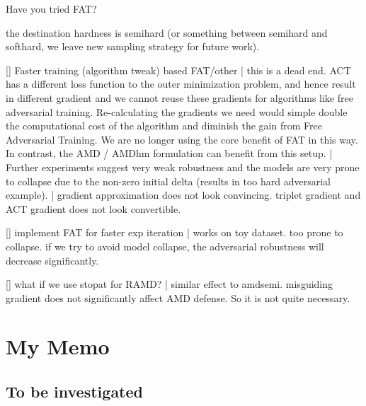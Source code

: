 	 Have you tried FAT?

	 the destination hardness is semihard (or something between semihard
		and softhard, we leave new sampling strategy for future work).

	 [\xmark] Faster training (algorithm tweak) based FAT/other | this is
		a dead end. ACT has a different loss function to the outer minimization
		problem, and hence result in different gradient and we cannot reuse
		these gradients for algorithms like free adversarial training.
		Re-calculating the gradients we need would simple double the
		computational cost of the algorithm and diminish the gain from Free
		Adversarial Training. We are no longer using the core benefit of FAT in
		this way. In contrast, the AMD / AMDhm formulation can benefit from
		this setup. | Further experiments suggest very weak robustness and the
		models are very prone to collapse due to the non-zero initial delta
		(results in too hard adversarial example).  | gradient approximation
		does not look convincing. triplet gradient and ACT gradient does not
		look convertible.

	 [\cmark] implement FAT for faster exp iteration | works on toy
		dataset. too prone to collapse. if we try to avoid model collapse, the
		adversarial robustness will decrease significantly.

	 [\cmark] what if we use stopat for RAMD? | similar effect to amdsemi.
		misguiding gradient does not significantly affect AMD defense. So it
		is not quite necessary.
	




\begin{comment}
\section{Visualizations}
Visualize robustness through the image retrieval task.
\end{comment}


\section{My Memo}

\subsection{To be investigated}

